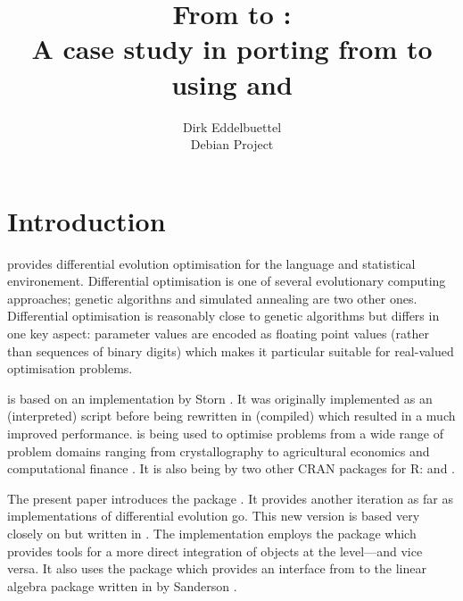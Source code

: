 \documentclass[nojss,shortnames,article]{jss}
\author{Dirk Eddelbuettel\\Debian Project} %
\title{From \pkg{DEoptim} to \pkg{RcppDE}: \\
  A case study in porting from \proglang{C} to \proglang{C++} \\
  using \pkg{Rcpp} and \pkg{RcppArmadillo}}
\begin{document}
\section{Introduction}

\citep{MullenArdiaEtAl:2009:DEoptim,ArdiaBoudtCarlEtAl:2010:DEoptim,CRAN:DEoptim}
provides differential evolution optimisation for the  language
and statistical environement.  Differential optimisation is one of several
evolutionary computing approaches; genetic algorithns and simulated annealing
are two other ones.  Differential optimisation is reasonably close to genetic
algorithms but differs in one key aspect: parameter values are encoded as
floating point values (rather than sequences of binary digits) which makes it
particular suitable for real-valued optimisation problems.

 is based on an implementation by Storn
\citep{PriceStornLampinen:2006:DE}. It was originally implemented as an
(interpreted)  script before being rewritten in (compiled)
 which resulted in a much improved performance.  is
being used to optimise problems from a wide range of problem domains ranging
from crystallography \citep{MullenKrayzmanLevin:2010:Atomic} to agricultural
economics \citep{BoernerHigginsKantelhardt:2007:Rainfall} and computational
finance \citep{BoudtPetersonCarl:2008:HFPortfolio}. It is also being by two
other CRAN packages for R:  \citep{CRAN:micEconCES} and
 \citep{CRAN:selectMeta}.

The present paper introduces the  package . It
provides another iteration as far as implementations of differential
evolution go. This new version is based very closely on  but
written in . The implementation employs the  package
\citep{CRAN:Rcpp} which provides tools for a more direct integration of
 objects at the  level---and vice versa. It also
uses the  package \citep{CRAN:RcppArmadillo} which
provides an interface from  to the  linear algebra
package written in  by Sanderson
\citep{Sanderson:2010:Armadillo}.
\end{document}
